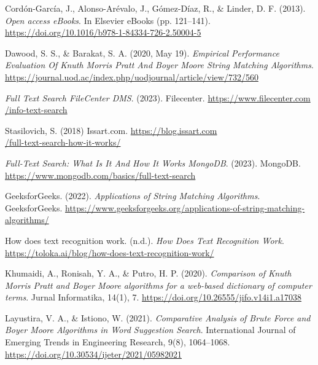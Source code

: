 \begin{thebibliography}{30}
    Cordón-García, J., Alonso-Arévalo, J., Gómez-Díaz, R., \& Linder, D. F. (2013). \emph{Open access
    eBooks}. In Elsevier eBooks (pp. 121–141).
    \href{https://doi.org/10.1016/b978-1-84334-726-2.50004-5}{https://doi.org/10.1016/b978-1-84334-726-2.50004-5}

    Dawood, S. S., \& Barakat, S. A. (2020, May 19). \emph{Empirical Performance Evaluation Of Knuth
    Morris Pratt And Boyer Moore String Matching Algorithms}.
    \href{https://journal.uod.ac/index.php/uodjournal/article/view/732/560}{https://journal.uod.ac/index.php/uodjournal/article/view/732/560}

    \emph{Full Text Search \textbar{} FileCenter DMS}. (2023). Filecenter. 
    \href{https://www.filecenter.com/info-text-search.html#:~:text=In\%20a\%20nutshell\%2C\%20full\%20text,merely\%20searching\%20the\%20file\%20nameS}{https://www.filecenter.com\\/info-text-search}

    Stasilovich, S. (2018) Issart.com.
    \href{https://blog.issart.com/full-text-search-how-it-works/}{https://blog.issart.com\\/full-text-search-how-it-works/}

    \emph{Full-Text Search: What Is It And How It Works \textbar{} MongoDB}. (2023). MongoDB.
    \href{https://www.mongodb.com/basics/full-text-search}{https://www.mongodb.com/basics/full-text-search}

    GeeksforGeeks. (2022). \emph{Applications of String Matching Algorithms}. GeeksforGeeks.
    \href{https://www.geeksforgeeks.org/applications-of-string-matching-algorithms/}{https://www.geeksforgeeks.org/applications-of-string-matching-algorithms/}

    How does text recognition work. (n.d.). \emph{How Does Text Recognition Work}.
    \href{https://toloka.ai/blog/how-does-text-recognition-work/}{https://toloka.ai/blog/how-does-text-recognition-work/}

    Khumaidi, A., Ronisah, Y. A., \& Putro, H. P. (2020). \emph{Comparison of Knuth Morris Pratt and
    Boyer Moore algorithms for a web-based dictionary of computer terms}. Jurnal Informatika, 14(1), 7. 
    \href{https://doi.org/10.26555/jifo.v14i1.a17038}{https://doi.org/10.26555/jifo.v14i1.a17038}

    Layustira, V. A., \& Istiono, W. (2021). \emph{Comparative Analysis of Brute Force and Boyer
    Moore Algorithms in Word Suggestion Search}. International Journal of Emerging Trends in
    Engineering Research, 9(8), 1064–1068. 
    \href{https://doi.org/10.30534/ijeter/2021/05982021}{https://doi.org/10.30534/ijeter/2021/05982021}


\end{thebibliography}
